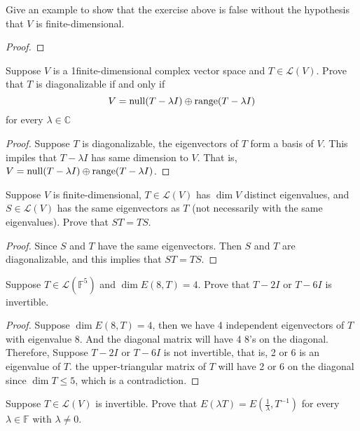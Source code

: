 \begin{exercise}
Give an example to show that the exercise above is false without
the hypothesis that $V$ is finite-dimensional.
\end{exercise}

\begin{proof}
\end{proof}

\begin{exercise}
Suppose $V$ is a 1finite-dimensional complex vector space and
$T \in \mathcal{L}(V)$. Prove that $T$ is diagonalizable if and only if \[
	V = \mathop{\mathrm{null}} (T - \lambda I) \oplus \mathop{\mathrm{range}} (T - \lambda I)\]
for every $\lambda \in \mathbb{C}$
\end{exercise}
\begin{proof}
	Suppose $T$ is diagonalizable, the eigenvectors of
	$T$ form a basis of $V$. This impiles that $T - \lambda I$
	has same dimension to $V$. That is, $V = \mathop{\mathrm{null}} (T - \lambda I) \oplus \mathop{\mathrm{range}} (T - \lambda I)$.
\end{proof}

\begin{exercise}
Suppose $V$ is finite-dimensional, $T \in \mathcal{L}(V)$ has $\dim V$ distinct
eigenvalues, and $S \in \mathcal{L}(V)$ has the same eigenvectors as $T$
(not necessarily with the same eigenvalues). Prove that $ST = TS$.
\end{exercise}
\begin{proof}
	Since $S$ and $T$ have the same eigenvectors.
	Then $S$ and $T$ are diagonalizable, and this implies that $ST = TS$.
\end{proof}

\begin{exercise}
Suppose $T \in \mathcal{L}(\mathbb{F}^5)$ and $\dim E(8,T) = 4$.
Prove that $T - 2I$ or $T - 6I$ is invertible.
\end{exercise}
\begin{proof}
	Suppose $\dim E(8,T) = 4$, then we have 4 independent
	eigenvectors of $T$ with eigenvalue 8. And the diagonal matrix will have 4 8's on the diagonal.
	Therefore, Suppose $T - 2I$ or $T - 6I$ is not invertible, that is, 2 or 6 is an eigenvalue of $T$.
	the upper-triangular matrix of $T$ will have 2 or 6 on the diagonal since $\dim T \leq 5$, which is a contradiction.
\end{proof}

\begin{exercise}
Suppose $T \in \mathcal{L}(V)$ is invertible. Prove that
$E(\lambda T) = E(\frac{1}{\lambda}, T^{-1})$ for every $\lambda \in \mathbb{F}$
with $\lambda \neq 0$.
\end{exercise}

